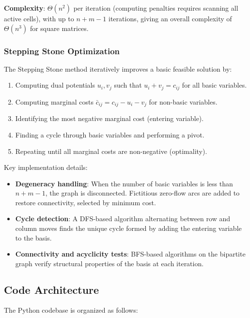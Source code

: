 \documentclass[12pt,a4paper]{article}
\begin{document}
\textbf{Complexity}: $\Theta(n^2)$ per iteration (computing penalties requires scanning all active cells), with up to $n + m - 1$ iterations, giving an overall complexity of $\Theta(n^3)$ for square matrices.

\subsubsection{Stepping Stone Optimization}

The Stepping Stone method iteratively improves a basic feasible solution by:
\begin{enumerate}
  \item Computing dual potentials $u_i, v_j$ such that $u_i + v_j = c_{ij}$ for all basic variables.
  \item Computing marginal costs $\bar{c}_{ij} = c_{ij} - u_i - v_j$ for non-basic variables.
  \item Identifying the most negative marginal cost (entering variable).
  \item Finding a cycle through basic variables and performing a pivot.
  \item Repeating until all marginal costs are non-negative (optimality).
\end{enumerate}

Key implementation details:
\begin{itemize}
  \item \textbf{Degeneracy handling}: When the number of basic variables is less than $n + m - 1$, the graph is disconnected. Fictitious zero-flow arcs are added to restore connectivity, selected by minimum cost.
  \item \textbf{Cycle detection}: A DFS-based algorithm alternating between row and column moves finds the unique cycle formed by adding the entering variable to the basis.
  \item \textbf{Connectivity and acyclicity tests}: BFS-based algorithms on the bipartite graph verify structural properties of the basis at each iteration.
\end{itemize}

\subsection{Code Architecture}

The Python codebase is organized as follows:
\end{document}
